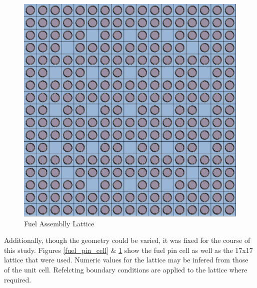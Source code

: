 \begin{figure}[htbp]
\caption{Fuel Assemblly Lattice}
\label{lattice}
\begin{center}
\includegraphics[scale=0.25]{multigroup_method/figs/lattice.eps}
\end{center}
\end{figure}

Additionally, though the geometry could be varied, 
it was fixed for the course of this study.  Figures \ref{fuel_pin_cell} \& \ref{lattice} show the fuel pin cell 
as well as the 17x17 lattice that were used.  Numeric values for the lattice may be infered from 
those of the unit cell.  Refelcting boundary conditions are applied to the lattice where required.


